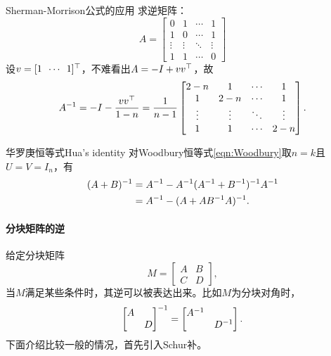 \begin{example}
	{Sherman-Morrison公式的应用}{}
	求逆矩阵：
	\[
		A=\begin{bmatrix}
			0&1&\cdots&1\\
			1&0&\cdots&1\\
			\vdots&\vdots&\ddots&\vdots\\
			1&1&\cdots&0
		\end{bmatrix}
	\]
	设$v=[1\enspace\cdots\enspace 1]^\top$，不难看出$A=-I+vv^\top$，故
	\[
		A^{-1}=-I-\frac{vv^\top}{1-n}=\frac1{n-1}\begin{bmatrix}
			2-n&1&\cdots&1\\
			1&2-n&\cdots&1\\
			\vdots&\vdots&\ddots&\vdots\\
			1&1&\cdots&2-n
		\end{bmatrix}.
	\]
\end{example}

\begin{theorem}
	{华罗庚恒等式}{Hua's identity}
	对Woodbury恒等式\eqref{eqn:Woodbury}取$n=k$且$U=V=I_n$，有 
		\begin{subequations}
			\begin{align}
				(A+B)^{-1}&=A^{-1}-A^{-1}(A^{-1}+B^{-1})^{-1} A^{-1}\\
				\label{eqn:Hua}
				&=A^{-1}-(A+AB^{-1} A)^{-1}.
			\end{align}
		\end{subequations}
\end{theorem}

\paragraph{分块矩阵的逆}

给定分块矩阵
\[
	M=\begin{bmatrix}
		A&B\\C&D
	\end{bmatrix},
\]
当$M$满足某些条件时，其逆可以被表达出来。比如$M$为分块对角时，
\begin{equation}
	\begin{bmatrix}
		A\\ &D
	\end{bmatrix}^{-1}=\begin{bmatrix}
		A^{-1}\\ &D^{-1}
	\end{bmatrix}.
\end{equation}
下面介绍比较一般的情况，首先引入Schur补。

